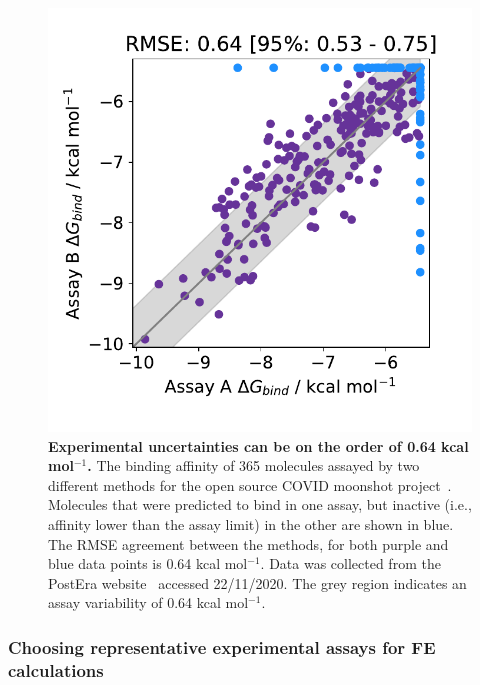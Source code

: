 \documentclass[9pt,bestpractices]{livecoms}
\begin{document}
\begin{figure}[!ht]
    \centering
    \includegraphics[width=0.95\linewidth]{figures/reporting/moonshot-assays.pdf}
    \caption{\textbf{Experimental uncertainties can be on the order of 0.64 kcal mol$^{-1}$.} The binding affinity of 365 molecules assayed by two different methods for the open source COVID moonshot project~\cite{achdout2020covid}. Molecules that were predicted to bind in one assay, but inactive (i.e., affinity lower than the assay limit) in the other are shown in blue. The RMSE agreement between the methods, for both purple and blue data points is 0.64 kcal mol$^{-1}$. Data was collected from the PostEra website~\cite{posteracovid} accessed 22/11/2020. The grey region indicates an assay variability of 0.64 kcal mol$^{-1}$.}
    \label{fig:expt_agreement}
\end{figure}



\subsubsection{Choosing representative experimental assays for FE calculations}
\end{document}
